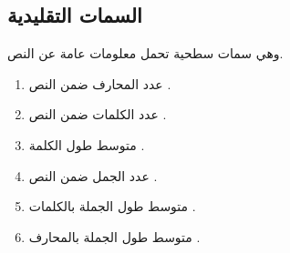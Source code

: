 \subsection{السمات التقليدية }
وهي سمات سطحية تحمل معلومات عامة عن النص.
\begin{enumerate}
	\item 
	عدد المحارف ضمن النص .
	\item 
	عدد الكلمات ضمن النص .
	\item 
	متوسط طول الكلمة .
	\item 
	عدد الجمل ضمن النص .
	\item 
	متوسط طول الجملة بالكلمات .
	\item 
	متوسط طول الجملة بالمحارف .
\end{enumerate}




